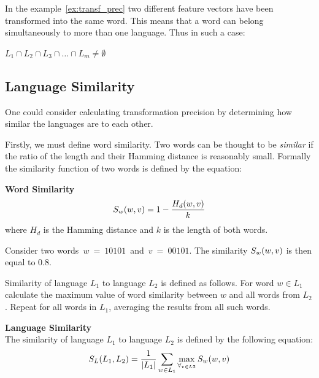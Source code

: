 \documentclass{mini}
\begin{document}
In the example~\ref{ex:transf_prec} two different feature vectors have been transformed into the same word. This means that a word can belong simultaneously to more than one language. Thus in such a case:
\begin{center}
    $L_{1} \cap L_{2} \cap L_{3} \cap \ldots \cap L_{m} \neq \emptyset$
\end{center}

\subsection{Language Similarity}\label{sec:lan_theory_lan_sim}
One could consider calculating transformation precision by determining how similar the languages are to each other.

Firstly, we must define word similarity. Two words can be thought to be \textit{similar} if the ratio of the length and their Hamming distance is reasonably small. Formally the similarity function of two words is defined by the equation:

\begin{definition} {\bf Word Similarity}
    \begin{equation}
    S_{w}(w,v) = 1 - \frac{H_d(w,v)}{k}
    \end{equation}
    where $H_d$ is the Hamming distance and $k$ is the length of both words.
\end{definition}

Consider two words~$w~=~10101$~and~$v~=~00101$. The similarity $S_{w}(w,v)$ is then equal to $0.8$.

Similarity of language $L_{1}$ to language $L_{2}$ is defined as follows. For word $w \in L_{1}$ calculate the maximum value of word similarity between $w$ and all words from $L_{2}$. Repeat for all words in $L_{1}$, averaging the results from all such words.

\begin{definition} {\bf Language Similarity\\}
The similarity of language $L_{1}$ to language $L_{2}$ is defined by the following equation:
    \begin{equation}
    S_{L}(L_{1},L_{2}) = \frac{1}{|L_{1}|} \sum_{w \in L_{1}} \max_{\forall_{v \in L{2}}} S_{w}(w,v)
    \end{equation}

\end{definition}
\end{document}
